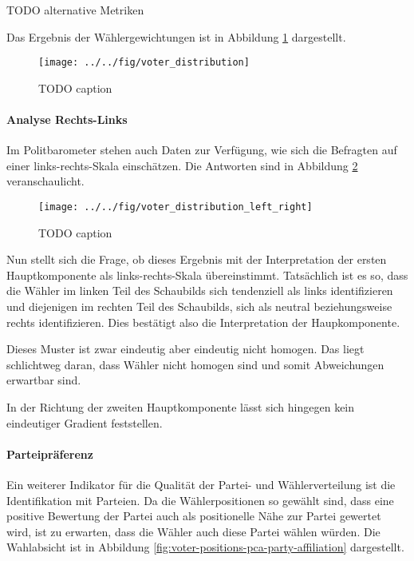 TODO alternative Metriken

Das Ergebnis der Wählergewichtungen ist in Abbildung \ref{fig:voter-positions-pca} dargestellt.

\begin{figure}[htb]
	\centering
	\texttt{[image: ../../fig/voter\_distribution]}
	\caption{TODO caption}
	\label{fig:voter-positions-pca}
\end{figure}

\paragraph{Analyse Rechts-Links}
Im Politbarometer stehen auch Daten zur Verfügung, wie sich die Befragten auf einer links-rechts-Skala einschätzen. Die Antworten sind in Abbildung \ref{fig:voter-positions-pca-left-right} veranschaulicht.

\begin{figure}[htb]
	\centering
	\texttt{[image: ../../fig/voter\_distribution\_left\_right]}
	\caption{TODO caption}
	\label{fig:voter-positions-pca-left-right}
\end{figure}

Nun stellt sich die Frage, ob dieses Ergebnis mit der Interpretation der ersten Hauptkomponente als links-rechts-Skala übereinstimmt. Tatsächlich ist es so, dass die Wähler im linken Teil des Schaubilds sich tendenziell als links identifizieren und diejenigen im rechten Teil des Schaubilds, sich als neutral beziehungsweise rechts identifizieren. Dies bestätigt also die Interpretation der Haupkomponente.

Dieses Muster ist zwar eindeutig aber eindeutig nicht homogen. Das liegt schlichtweg daran, dass Wähler nicht homogen sind und somit Abweichungen erwartbar sind.

In der Richtung der zweiten Hauptkomponente lässt sich hingegen kein eindeutiger Gradient feststellen.

\paragraph{Parteipräferenz}

Ein weiterer Indikator für die Qualität der Partei- und Wählerverteilung ist die Identifikation mit Parteien. Da die Wählerpositionen so gewählt sind, dass eine positive Bewertung der Partei auch als positionelle Nähe zur Partei gewertet wird, ist zu erwarten, dass die Wähler auch diese Partei wählen würden. Die Wahlabsicht ist in Abbildung \ref{fig:voter-positions-pca-party-affiliation} dargestellt.

